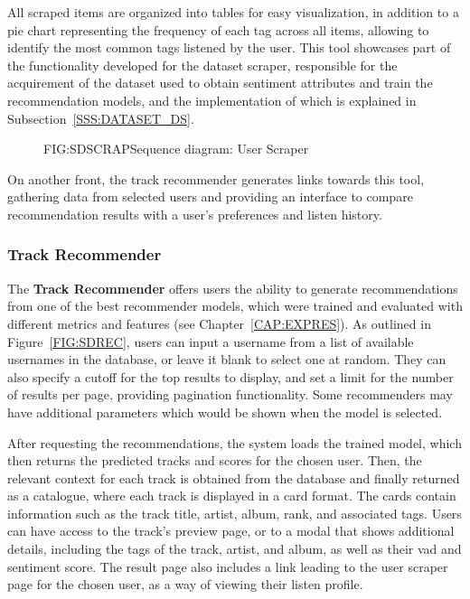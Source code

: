 All scraped items are organized into tables for easy visualization, in addition to a pie chart representing the frequency of each tag across all items, allowing to identify the most common tags listened by the user. This tool showcases part of the functionality developed for the dataset scraper, responsible for the acquirement of the dataset used to obtain sentiment attributes and train the recommendation models, and the implementation of which is explained in Subsection~\ref{SSS:DATASET_DS}.

\begin{figure}[Sequence diagram: User Scraper]{FIG:SDSCRAP}{Sequence diagram: User Scraper}
\end{figure}

On another front, the track recommender generates links towards this tool, gathering data from selected users and providing an interface to compare recommendation results with a user's preferences and listen history.

\subsubsection{Track Recommender}

The \textbf{Track Recommender} offers users the ability to generate recommendations from one of the best recommender models, which were trained and evaluated with different metrics and features (see Chapter~\ref{CAP:EXPRES}). As outlined in Figure~\ref{FIG:SDREC}, users can input a username from a list of available usernames in the database, or leave it blank to select one at random. They can also specify a cutoff for the top results to display, and set a limit for the number of results per page, providing pagination functionality. Some recommenders may have additional parameters which would be shown when the model is selected.

After requesting the recommendations, the system loads the trained model, which then returns the predicted tracks and scores for the chosen user. Then, the relevant context for each track is obtained from the database and finally returned as a catalogue, where each track is displayed in a card format. The cards contain information such as the track title, artist, album, rank, and associated tags. Users can have access to the track's preview page, or to a modal that shows additional details, including the tags of the track, artist, and album, as well as their \acs{vad} and sentiment score. The result page also includes a link leading to the user scraper page for the chosen user, as a way of viewing their listen profile.

